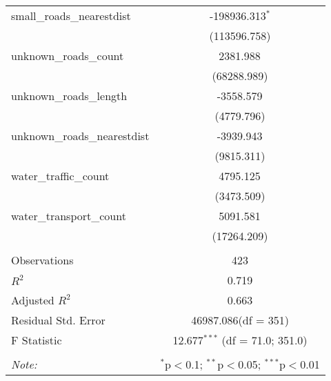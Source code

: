 \begin{table}[!htbp]
\begin{tabular}{@{\extracolsep{5pt}}lc}
 small_roads_nearestdist & -198936.313$^{*}$ \\
  & (113596.758) \\
 unknown_roads_count & 2381.988$^{}$ \\
  & (68288.989) \\
 unknown_roads_length & -3558.579$^{}$ \\
  & (4779.796) \\
 unknown_roads_nearestdist & -3939.943$^{}$ \\
  & (9815.311) \\
 water_traffic_count & 4795.125$^{}$ \\
  & (3473.509) \\
 water_transport_count & 5091.581$^{}$ \\
  & (17264.209) \\
\hline \\[-1.8ex]
 Observations & 423 \\
 $R^2$ & 0.719 \\
 Adjusted $R^2$ & 0.663 \\
 Residual Std. Error & 46987.086(df = 351)  \\
 F Statistic & 12.677$^{***}$ (df = 71.0; 351.0) \\
\hline
\hline \\[-1.8ex]
\textit{Note:} & \multicolumn{1}{r}{$^{*}$p$<$0.1; $^{**}$p$<$0.05; $^{***}$p$<$0.01} \\
\end{tabular}
\end{table}